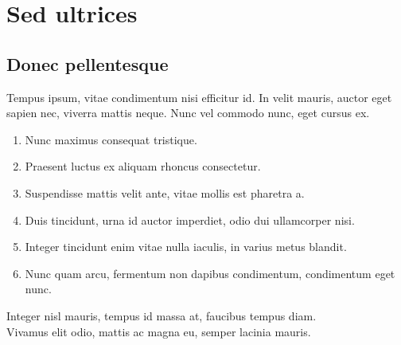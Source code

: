 \section{Sed ultrices} \label{sec:sed-ultrices}

\subsection{Donec pellentesque}

Tempus ipsum, vitae condimentum nisi efficitur id. In velit mauris, auctor eget
sapien nec, viverra mattis neque. Nunc vel commodo nunc, eget cursus ex.

\begin{enumerate}
\item{Nunc maximus consequat tristique.}
\item{Praesent luctus ex aliquam rhoncus consectetur.}
\item{Suspendisse mattis velit ante, vitae mollis est pharetra a.}
\item{Duis tincidunt, urna id auctor imperdiet, odio dui ullamcorper nisi.}
\item{Integer tincidunt enim vitae nulla iaculis, in varius metus blandit.}
\item{Nunc quam arcu, fermentum non dapibus condimentum, condimentum eget nunc.}
\end{enumerate}

\begin{remark}
Integer nisl mauris, tempus id massa at, faucibus tempus diam.\\
Vivamus elit odio, mattis ac magna eu, semper lacinia mauris.
\end{remark}
